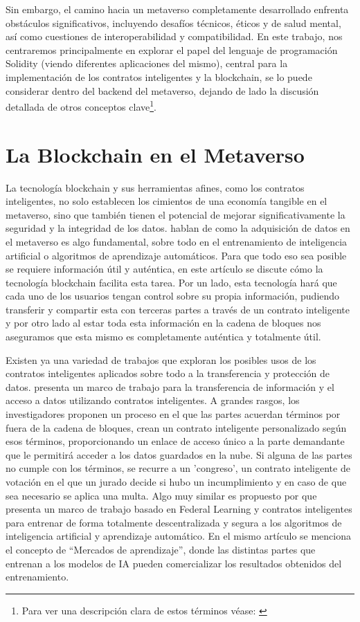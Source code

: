 \documentclass[a4paper,10pt]{article}
\begin{document}
	Sin embargo, el camino hacia un metaverso completamente desarrollado enfrenta obstáculos significativos, incluyendo desafíos técnicos, éticos y de salud mental, así como cuestiones de interoperabilidad y compatibilidad.\newline
	En este trabajo, nos centraremos principalmente en explorar el papel del lenguaje de programación Solidity (viendo diferentes aplicaciones del mismo), central para la implementación de los contratos inteligentes y la blockchain, se lo puede considerar dentro del backend del metaverso, dejando de lado la discusión detallada de otros conceptos clave\footnote{Para ver una descripción clara de estos términos véase: \cite{grandury2022implementacion}}.
	\section{La Blockchain en el Metaverso}
	La tecnología blockchain y sus herramientas afines, como los contratos inteligentes, no solo establecen los cimientos de una economía tangible en el metaverso, sino que también tienen el potencial de mejorar significativamente la seguridad y la integridad de los datos. \textcite{huynh2023blockchain} hablan de como la adquisición de datos en el metaverso es algo fundamental, sobre todo en el entrenamiento de inteligencia artificial o algoritmos de aprendizaje automáticos. Para que todo eso sea posible se requiere información útil y auténtica, en este artículo se discute cómo la tecnología blockchain facilita esta tarea. Por un lado, esta tecnología hará que cada uno de los usuarios tengan control sobre su propia información, pudiendo transferir y compartir esta con terceras partes a través de un contrato inteligente y por otro lado al estar toda esta información en la cadena de bloques nos aseguramos que esta mismo es completamente auténtica y totalmente útil.
	
	Existen ya una variedad de trabajos que exploran los posibles usos de los contratos inteligentes aplicados sobre todo a la transferencia y protección de datos. \textcite{liu2018enforceable} presenta un marco de trabajo para la transferencia de información y el acceso a datos utilizando contratos inteligentes. A grandes rasgos, los investigadores proponen un proceso en el que las partes acuerdan términos por fuera de la cadena de bloques, crean un contrato inteligente personalizado según esos términos, proporcionando un enlace de acceso único a la parte demandante que le permitirá acceder a los datos guardados en la nube. Si alguna de las partes no cumple con los términos, se recurre a un 'congreso', un contrato inteligente de votación en el que un jurado decide si hubo un incumplimiento y en caso de que sea necesario se aplica una multa. Algo muy similar es propuesto por \textcite{ouyang2020learning} que presenta un marco de trabajo basado en Federal Learning y contratos inteligentes para entrenar de forma totalmente descentralizada y segura a los algoritmos de inteligencia artificial y aprendizaje automático. En el mismo artículo se menciona el concepto de “Mercados de aprendizaje”, donde las distintas partes que entrenan a los modelos de IA pueden comercializar los resultados obtenidos del entrenamiento.
	
\end{document}
